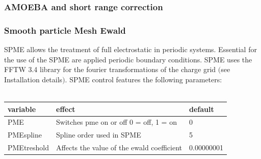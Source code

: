 \documentclass[10pt,a4paper]{article} %
\newif\ifdevmode %
\begin{document}
		\subsubsection{AMOEBA and short range correction}
		\ifdevmode \colorbox{red}{Blalala yaddayaddayadda... insert stuff here.} \fi
		\subsubsection{Smooth particle Mesh Ewald}
		\ac{SPME}\supercite{spme} allows the treatment of full electrostatic in periodic systems. Essential for the use of the \ac{SPME} are applied periodic boundary conditions. \ac{SPME} uses the FFTW 3.4 library for the fourier transformations of the charge grid $($see Installation details$)$.  \ac{SPME} control features the following parameters:\\~\\

		\begin{tabularx}{\textwidth}{l|l|l}
			variable & effect & default \\
			\hline
			PME & Switches pme on or off 0 = off, 1 = on & 0 \\
			PMEspline & Spline order used in SPME & 5 \\
			PMEtreshold & Affects the value of the ewald coefficient & 0.00000001 \\
		\end{tabularx}

		\ifdevmode
		\colorbox{red}{WE NEED TO ADRESS THE FFTW LIB ISSUE!}
		\fi

\end{document}

